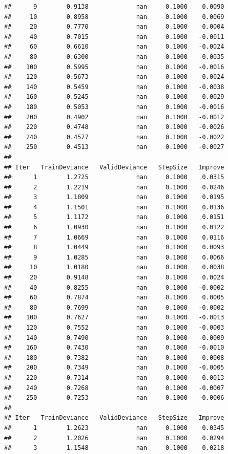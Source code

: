 \documentclass[
]{book}
\begin{document}
\begin{verbatim}
##      9        0.9138             nan     0.1000    0.0090
##     10        0.8958             nan     0.1000    0.0069
##     20        0.7770             nan     0.1000    0.0004
##     40        0.7015             nan     0.1000   -0.0011
##     60        0.6610             nan     0.1000   -0.0024
##     80        0.6300             nan     0.1000   -0.0035
##    100        0.5995             nan     0.1000   -0.0016
##    120        0.5673             nan     0.1000   -0.0024
##    140        0.5459             nan     0.1000   -0.0038
##    160        0.5245             nan     0.1000   -0.0029
##    180        0.5053             nan     0.1000   -0.0016
##    200        0.4902             nan     0.1000   -0.0012
##    220        0.4748             nan     0.1000   -0.0026
##    240        0.4577             nan     0.1000   -0.0022
##    250        0.4513             nan     0.1000   -0.0027
## 
## Iter   TrainDeviance   ValidDeviance   StepSize   Improve
##      1        1.2725             nan     0.1000    0.0315
##      2        1.2219             nan     0.1000    0.0246
##      3        1.1809             nan     0.1000    0.0195
##      4        1.1501             nan     0.1000    0.0136
##      5        1.1172             nan     0.1000    0.0151
##      6        1.0930             nan     0.1000    0.0122
##      7        1.0669             nan     0.1000    0.0116
##      8        1.0449             nan     0.1000    0.0093
##      9        1.0285             nan     0.1000    0.0066
##     10        1.0180             nan     0.1000    0.0038
##     20        0.9148             nan     0.1000    0.0024
##     40        0.8255             nan     0.1000   -0.0002
##     60        0.7874             nan     0.1000    0.0005
##     80        0.7699             nan     0.1000   -0.0002
##    100        0.7627             nan     0.1000   -0.0013
##    120        0.7552             nan     0.1000   -0.0003
##    140        0.7490             nan     0.1000   -0.0009
##    160        0.7430             nan     0.1000   -0.0010
##    180        0.7382             nan     0.1000   -0.0008
##    200        0.7349             nan     0.1000   -0.0005
##    220        0.7314             nan     0.1000   -0.0013
##    240        0.7268             nan     0.1000   -0.0007
##    250        0.7253             nan     0.1000   -0.0006
## 
## Iter   TrainDeviance   ValidDeviance   StepSize   Improve
##      1        1.2623             nan     0.1000    0.0345
##      2        1.2026             nan     0.1000    0.0294
##      3        1.1548             nan     0.1000    0.0218

\end{verbatim}
\end{document}
